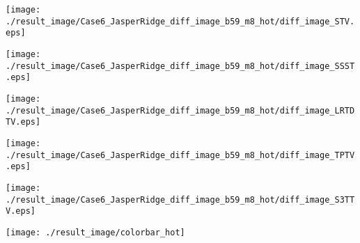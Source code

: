 \begin{figure*}[t]
\begin{center}
        \begin{minipage}{0.150\hsize}
            \centerline{\hspace{\hsize}} %
		\end{minipage}
        \begin{minipage}{0.150\hsize}
            \centerline{\texttt{[image: ./result\_image/Case6\_JasperRidge\_diff\_image\_b59\_m8\_hot/diff\_image\_STV.eps]}} %
        \end{minipage}
        \begin{minipage}{0.150\hsize}
            \centerline{\texttt{[image: ./result\_image/Case6\_JasperRidge\_diff\_image\_b59\_m8\_hot/diff\_image\_SSST.eps]}} %
        \end{minipage}
        \begin{minipage}{0.150\hsize}
            \centerline{\texttt{[image: ./result\_image/Case6\_JasperRidge\_diff\_image\_b59\_m8\_hot/diff\_image\_LRTDTV.eps]}} %
        \end{minipage}
        \begin{minipage}{0.150\hsize}
            \centerline{\texttt{[image: ./result\_image/Case6\_JasperRidge\_diff\_image\_b59\_m8\_hot/diff\_image\_TPTV.eps]}} %
        \end{minipage}
        \begin{minipage}{0.150\hsize}
            \centerline{\texttt{[image: ./result\_image/Case6\_JasperRidge\_diff\_image\_b59\_m8\_hot/diff\_image\_S3TTV.eps]}} %
        \end{minipage}
        \begin{minipage}{0.055\hsize}
            \centerline{\texttt{[image: ./result\_image/colorbar\_hot]}} %
        \end{minipage}

        \vspace{1mm}
        

\end{center}
\end{figure*}
